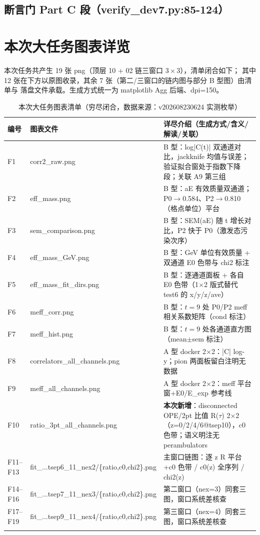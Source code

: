 \documentclass[UTF8]{ctexart}
\begin{document}
\subsection{断言门 Part C 段（verify\_dev7.py:85-124）}


\section{本次大任务图表详览}
本次任务共产生 19 张 png（顶层 10 + 02 链三窗口 $3\times3$），清单闭合如下；
其中 12 张在下方以原图收录，其余 7 张（第二/三窗口的链内图与部分 B 型图）由清单与
落盘文件承载。生成方式统一为 matplotlib Agg 后端、dpi=150。

\begin{xltabular}{\textwidth}{llX}
\toprule
编号 & 图表文件 & 详尽介绍（生成方式/含义/解读/关联） \\
\midrule
\endhead
F1 & corr2\_raw.png & B 型：log|C(t)| 双通道对比，jackknife 均值与误差；验证拟合窗处于指数下降段；关联 A9 第三组 \\
F2 & eff\_mass.png & B 型：aE 有效质量双通道；P0$\to$0.584、P2$\to$0.810（格点单位）平台 \\
F3 & sem\_comparison.png & B 型：SEM(aE) 随 t 增长对比，P2 快于 P0（激发态污染次序） \\
F4 & eff\_mass\_GeV.png & B 型：GeV 单位有效质量 + 双通道 E0 色带与 chi2 标注 \\
F5 & eff\_mass\_fit\_dirs.png & B 型：逐通道面板 + 各自 E0 色带（1$\times$2 版式替代 test6 的 x/y/z/ave） \\
F6 & meff\_corr.png & B 型：$t=9$ 处 P0/P2 meff 相关系数矩阵（cond 标注） \\
F7 & meff\_hist.png & B 型：$t=9$ 处各通道直方图（mean$\pm$sem 标注） \\
F8 & correlators\_all\_channels.png & A 型 docker 2$\times$2：|C| log-y；pion 两面板留白注明无数据 \\
F9 & meff\_all\_channels.png & A 型 docker 2$\times$2：meff 平台窗+E0/E\_exp 参考线 \\
F10 & ratio\_3pt\_all\_channels.png & \textbf{本次新增}：disconnected OPE/2pt 比值 R($\tau$) 2$\times$2（z=0/2/4/6@tsep10），c0 色带；语义明注无 perambulators \\
F11--F13 & fit\_...tsep6\_11\_nex2/\{ratio,c0,chi2\}.png & 主窗口链图：逐 z R 平台+c0 色带 / c0(z) 全序列 / chi2(z) \\
F14--F16 & fit\_...tsep7\_11\_nex3/\{ratio,c0,chi2\}.png & 第二窗口（nex=3）同套三图，窗口系统差核查 \\
F17--F19 & fit\_...tsep9\_11\_nex4/\{ratio,c0,chi2\}.png & 第三窗口（nex=4）同套三图，窗口系统差核查 \\
\bottomrule
\caption{本次大任务图表清单（穷尽闭合，数据来源：v202608230624 实测枚举）}
\end{xltabular}
\end{document}
